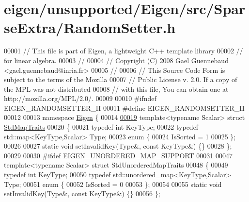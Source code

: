 \hypertarget{eigen_2unsupported_2_eigen_2src_2_sparse_extra_2_random_setter_8h_source}{}\section{eigen/unsupported/\+Eigen/src/\+Sparse\+Extra/\+Random\+Setter.h}
\label{eigen_2unsupported_2_eigen_2src_2_sparse_extra_2_random_setter_8h_source}

\begin{DoxyCode}
00001 \textcolor{comment}{// This file is part of Eigen, a lightweight C++ template library}
00002 \textcolor{comment}{// for linear algebra.}
00003 \textcolor{comment}{//}
00004 \textcolor{comment}{// Copyright (C) 2008 Gael Guennebaud <gael.guennebaud@inria.fr>}
00005 \textcolor{comment}{//}
00006 \textcolor{comment}{// This Source Code Form is subject to the terms of the Mozilla}
00007 \textcolor{comment}{// Public License v. 2.0. If a copy of the MPL was not distributed}
00008 \textcolor{comment}{// with this file, You can obtain one at http://mozilla.org/MPL/2.0/.}
00009 
00010 \textcolor{preprocessor}{#ifndef EIGEN\_RANDOMSETTER\_H}
00011 \textcolor{preprocessor}{#define EIGEN\_RANDOMSETTER\_H}
00012 
00013 \textcolor{keyword}{namespace }\hyperlink{namespace_eigen}{Eigen} \{ 
00014 
\hyperlink{struct_eigen_1_1_std_map_traits}{00019} \textcolor{keyword}{template}<\textcolor{keyword}{typename} Scalar> \textcolor{keyword}{struct }\hyperlink{struct_eigen_1_1_std_map_traits}{StdMapTraits}
00020 \{
00021   \textcolor{keyword}{typedef} \textcolor{keywordtype}{int} KeyType;
00022   \textcolor{keyword}{typedef} std::map<KeyType,Scalar> Type;
00023   \textcolor{keyword}{enum} \{
00024     IsSorted = 1
00025   \};
00026 
00027   \textcolor{keyword}{static} \textcolor{keywordtype}{void} setInvalidKey(Type&, \textcolor{keyword}{const} KeyType&) \{\}
00028 \};
00029 
00030 \textcolor{preprocessor}{#ifdef EIGEN\_UNORDERED\_MAP\_SUPPORT}
00031 
00047 \textcolor{keyword}{template}<\textcolor{keyword}{typename} Scalar> \textcolor{keyword}{struct }StdUnorderedMapTraits
00048 \{
00049   \textcolor{keyword}{typedef} \textcolor{keywordtype}{int} KeyType;
00050   \textcolor{keyword}{typedef} std::unordered\_map<KeyType,Scalar> Type;
00051   \textcolor{keyword}{enum} \{
00052     IsSorted = 0
00053   \};
00054 
00055   \textcolor{keyword}{static} \textcolor{keywordtype}{void} setInvalidKey(Type&, \textcolor{keyword}{const} KeyType&) \{\}
00056 \};

\end{DoxyCode}
